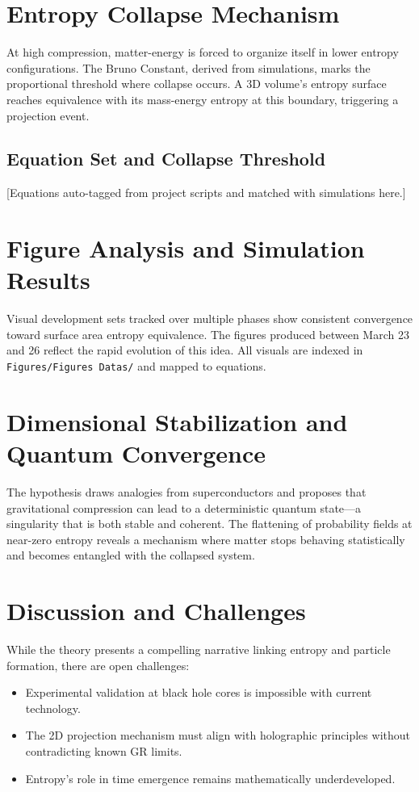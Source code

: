 \documentclass[12pt]{article}
\begin{document}
\section{Entropy Collapse Mechanism}
At high compression, matter-energy is forced to organize itself in lower entropy configurations. The Bruno Constant, derived from simulations, marks the proportional threshold where collapse occurs. A 3D volume's entropy surface reaches equivalence with its mass-energy entropy at this boundary, triggering a projection event.

\subsection{Equation Set and Collapse Threshold}
[Equations auto-tagged from project scripts and matched with simulations here.]

\section{Figure Analysis and Simulation Results}
Visual development sets tracked over multiple phases show consistent convergence toward surface area entropy equivalence. The figures produced between March 23 and 26 reflect the rapid evolution of this idea. All visuals are indexed in \texttt{Figures/Figures Datas/} and mapped to equations.

\section{Dimensional Stabilization and Quantum Convergence}
The hypothesis draws analogies from superconductors and proposes that gravitational compression can lead to a deterministic quantum state—a singularity that is both stable and coherent. The flattening of probability fields at near-zero entropy reveals a mechanism where matter stops behaving statistically and becomes entangled with the collapsed system.

\section{Discussion and Challenges}
While the theory presents a compelling narrative linking entropy and particle formation, there are open challenges:
\begin{itemize}
    \item Experimental validation at black hole cores is impossible with current technology.
    \item The 2D projection mechanism must align with holographic principles without contradicting known GR limits.
    \item Entropy's role in time emergence remains mathematically underdeveloped.
\end{itemize}
\end{document}
